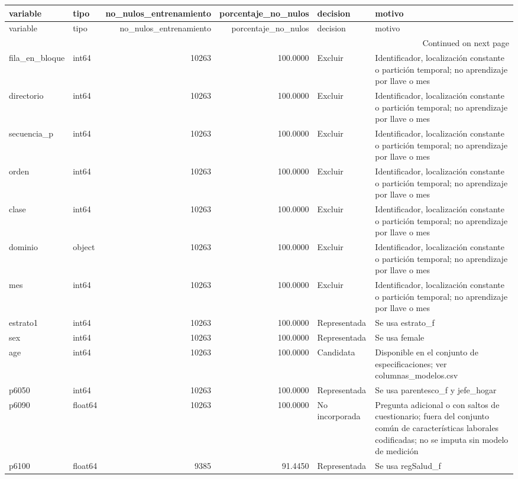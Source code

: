 \begin{longtable}{llrrll}
\toprule
variable & tipo & no\_nulos\_entrenamiento & porcentaje\_no\_nulos & decision & motivo \\
\midrule
\endfirsthead
\toprule
variable & tipo & no\_nulos\_entrenamiento & porcentaje\_no\_nulos & decision & motivo \\
\midrule
\endhead
\midrule
\multicolumn{6}{r}{Continued on next page} \\
\midrule
\endfoot
\bottomrule
\endlastfoot
fila\_en\_bloque & int64 & 10263 & 100.0000 & Excluir & Identificador, localización constante o partición temporal; no aprendizaje por llave o mes \\
directorio & int64 & 10263 & 100.0000 & Excluir & Identificador, localización constante o partición temporal; no aprendizaje por llave o mes \\
secuencia\_p & int64 & 10263 & 100.0000 & Excluir & Identificador, localización constante o partición temporal; no aprendizaje por llave o mes \\
orden & int64 & 10263 & 100.0000 & Excluir & Identificador, localización constante o partición temporal; no aprendizaje por llave o mes \\
clase & int64 & 10263 & 100.0000 & Excluir & Identificador, localización constante o partición temporal; no aprendizaje por llave o mes \\
dominio & object & 10263 & 100.0000 & Excluir & Identificador, localización constante o partición temporal; no aprendizaje por llave o mes \\
mes & int64 & 10263 & 100.0000 & Excluir & Identificador, localización constante o partición temporal; no aprendizaje por llave o mes \\
estrato1 & int64 & 10263 & 100.0000 & Representada & Se usa estrato\_f \\
sex & int64 & 10263 & 100.0000 & Representada & Se usa female \\
age & int64 & 10263 & 100.0000 & Candidata & Disponible en el conjunto de especificaciones; ver columnas\_modelos.csv \\
p6050 & int64 & 10263 & 100.0000 & Representada & Se usa parentesco\_f y jefe\_hogar \\
p6090 & float64 & 10263 & 100.0000 & No incorporada & Pregunta adicional o con saltos de cuestionario; fuera del conjunto común de características laborales codificadas; no se imputa sin modelo de medición \\
p6100 & float64 & 9385 & 91.4450 & Representada & Se usa regSalud\_f \\

\end{longtable}
